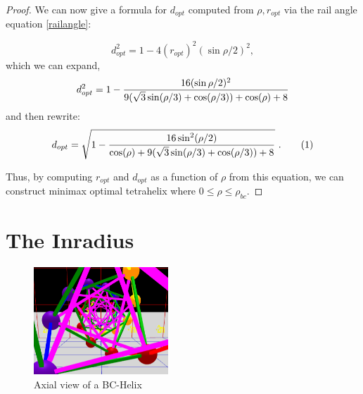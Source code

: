 \documentclass[twocolumn,10pt]{asme2ej}
\newcommand\numberthis{\addtocounter{equation}{1}\tag{\theequation}}
\begin{document}
\begin{proof}
We can now give a formula for $ d_{opt} $ computed from $\rho, r_{opt}$ via the rail angle equation \cref{railangle}:

\begin{equation}
  d_{opt}^2 = 1 - 4 (r_{opt})^2 (\sin{ \rho / 2})^2,
\end{equation}
which we can expand,
\begin{equation}
  d_{opt}^2 = 1 - \frac{16(\sin{ \rho / 2})^2}{9 ( \sqrt{3} \sin(\rho/3) + \cos(\rho/3)) + \cos(\rho)+ 8 }    \\
\end{equation}
and then rewrite:
\begin{equation}
    d_{opt} = \sqrt{1 - \frac{16 \sin^2(\rho / 2) }{ \cos(\rho) + 9( \sqrt{3} \sin(\rho/3) + \cos(\rho/3)) + 8 }}  \text{ .}  \numberthis  \label{dopt}  \\      
\end{equation}



Thus, by computing $r_{opt}$  and $d_{opt}$ as a function of $\rho$ from this equation, we can construct minimax optimal tetrahelix where $0 \leq \rho \leq \rho_{bc}$.
\end{proof}

\section{The Inradius}

\begin{figure}
     \centering
     \includegraphics[width=0.45\textwidth]{figures/AxialView.png}
     \caption{Axial view of a BC-Helix}
  \label{axialview}     
\end{figure}
\end{document}

